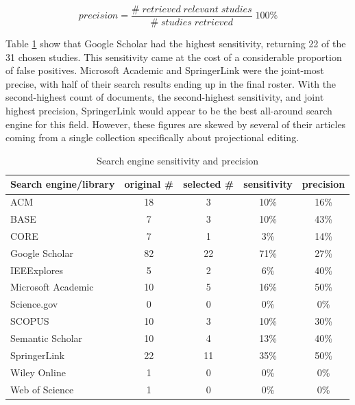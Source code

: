 \[
        precision = \frac{\#\;retrieved\;relevant\;studies}{\#\;studies\;retrieved} \;100\%
\]

Table \ref{table:sensitivity_precision} show that Google Scholar had the highest sensitivity, returning 22 of the 31 chosen studies.
This sensitivity came at the cost of a considerable proportion of false positives.
Microsoft Academic and SpringerLink were the joint-most precise, with half of their search results ending up in the final roster.
With the second-highest count of documents, the second-highest sensitivity, and joint highest precision, SpringerLink would appear to be the best all-around search engine for this field.
However, these figures are skewed by several of their articles coming from a single collection specifically about projectional editing.

\begin{table}[h]
    \begin{center}
        \begin{tabular}{ | l | c | c | c | c |} 
            \hline
            Search engine/library     & original \# & selected \# & sensitivity & precision\\
            \hline
            \hline
            ACM                        & 18          & 3           & 10\%        &  16\%    \\
            BASE                       & 7           & 3           & 10\%        &  43\%    \\
            CORE                       & 7           & 1           &  3\%        &  14\%    \\
            Google Scholar             & 82          & 22          & 71\%        &  27\%    \\
            IEEExplores                & 5           & 2           &  6\%        &  40\%    \\
            Microsoft Academic         & 10          & 5           & 16\%        &  50\%    \\
            Science.gov                & 0           & 0           &  0\%        &   0\%    \\
            SCOPUS                     & 10          & 3           & 10\%        &  30\%    \\
            Semantic Scholar           & 10          & 4           & 13\%        &  40\%    \\
            SpringerLink               & 22          & 11          & 35\%        &  50\%    \\
            Wiley Online               & 1           & 0           &  0\%        &   0\%    \\
            Web of Science             & 1           & 0           &  0\%        &   0\%    \\
            \hline
        \end{tabular}
    \end{center}
    \caption{Search engine sensitivity and precision}
    \label{table:sensitivity_precision}
\end{table}

